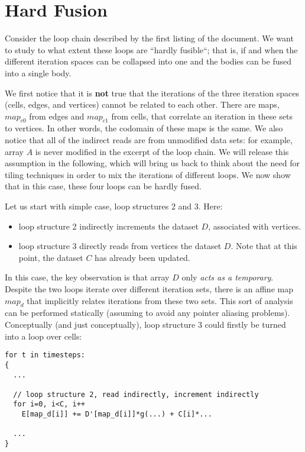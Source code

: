 \documentclass[a4paper]{article}
\begin{document}
\section{Hard Fusion}
Consider the loop chain described by the first listing of the document. We want to study to what extent these loops are ``hardly fusible``; that is, if and when the different iteration spaces can be collapsed into one and the bodies can be fused into a single body.

We first notice that it is \textbf{not} true that the iterations of the three iteration spaces (cells, edges, and vertices) cannot be related to each other. There are maps, $map_{c0}$ from edges and $map_{c1}$ from cells, that correlate an iteration in these sets to vertices. In other words, the codomain of these maps is the same. We also notice that all of the indirect reads are from unmodified data sets: for example, array $A$ is never modified in the excerpt of the loop chain. We will release this assumption in the following, which will bring us back to think about the need for tiling techniques in order to mix the iterations of different loops. We now show that in this case, these four loops can be hardly fused.

Let us start with simple case, loop structures 2 and 3. Here:
\begin{itemize}
\item loop structure 2 indirectly increments the dataset $D$, associated with vertices.
\item loop structure 3 directly reads from vertices the dataset $D$. Note that at this point, the dataset $C$ has already been updated.
\end{itemize}
In this case, the key observation is that array $D$ only \textit{acts as a temporary}. Despite the two loops iterate over different iteration sets, there is an affine map $map_{d}$ that implicitly relates iterations from these two sets. This sort of analysis can be performed statically (assuming to avoid any pointer aliasing problems). Conceptually (and just conceptually), loop structure 3 could firstly be turned into a loop over cells:

\begin{footnotesize}
\begin{lstlisting}
for t in timesteps:
{
  ...
          
  // loop structure 2, read indirectly, increment indirectly
  for i=0, i<C, i++
    E[map_d[i]] += D'[map_d[i]]*g(...) + C[i]*...

  ...
}
\end{lstlisting}
\end{footnotesize}
\end{document}
